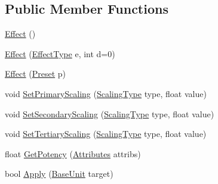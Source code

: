 \subsection*{Public Member Functions}
\begin{DoxyCompactItemize}
\item 
\mbox{\hyperlink{class_effect_a426033488b51897723a6aa15d1e66415}{Effect}} ()
\item 
\mbox{\hyperlink{class_effect_af2775716fce582c0a621f6c68ddb8574}{Effect}} (\mbox{\hyperlink{class_effect_a28d85888db94ec53ee9cb75e9706f6e4}{Effect\+Type}} e, int d=0)
\item 
\mbox{\hyperlink{class_effect_afc3ee0f70107f501148217c076092f40}{Effect}} (\mbox{\hyperlink{class_effect_a84f32661374cee093139535ae75c58ad}{Preset}} p)
\item 
void \mbox{\hyperlink{class_effect_a5c751c4432cf967c74fe16befbdbbe2e}{Set\+Primary\+Scaling}} (\mbox{\hyperlink{class_effect_af0ada789de40f58c24c46bf8ed2f300c}{Scaling\+Type}} type, float value)
\item 
void \mbox{\hyperlink{class_effect_a476b569a5adf97f1b691dcbb7e5cb325}{Set\+Secondary\+Scaling}} (\mbox{\hyperlink{class_effect_af0ada789de40f58c24c46bf8ed2f300c}{Scaling\+Type}} type, float value)
\item 
void \mbox{\hyperlink{class_effect_a021b689f1ccd675bc1b6fefe3071253f}{Set\+Tertiary\+Scaling}} (\mbox{\hyperlink{class_effect_af0ada789de40f58c24c46bf8ed2f300c}{Scaling\+Type}} type, float value)
\item 
float \mbox{\hyperlink{class_effect_a5af13ce8f65df2bfbba422a46e627fc0}{Get\+Potency}} (\mbox{\hyperlink{class_attributes}{Attributes}} attribs)
\item 
bool \mbox{\hyperlink{class_effect_a81689f18a4d3ae57ca39b71592be76ef}{Apply}} (\mbox{\hyperlink{class_base_unit}{Base\+Unit}} target)
\end{DoxyCompactItemize}

